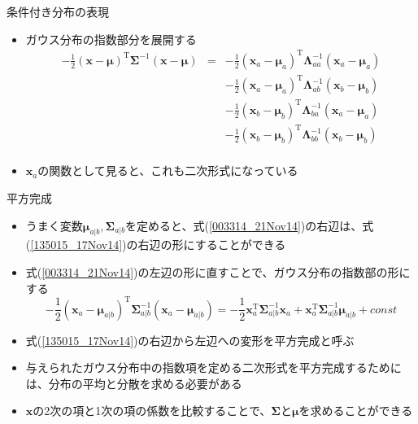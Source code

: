 \begin{frame}{条件付き分布の表現}
 \begin{itemize}
  \item ガウス分布の指数部分を展開する
        \begin{eqnarray}
         -\frac{1}{2}(\bm{x} - \bm{\mu})^{\mathrm{T}}\bm{\Sigma}^{-1}(\bm{x}-\bm{\mu}) &= &
          -\frac{1}{2}(\bm{x}_a - \bm{\mu}_a)^{\mathrm{T}}\bm{\Lambda}_{aa}^{-1}(\bm{x}_a-\bm{\mu}_a) \nonumber \\
         &&-\frac{1}{2}(\bm{x}_a - \bm{\mu}_a)^{\mathrm{T}}\bm{\Lambda}_{ab}^{-1}(\bm{x}_b-\bm{\mu}_b) \nonumber \\
         &&-\frac{1}{2}(\bm{x}_b - \bm{\mu}_b)^{\mathrm{T}}\bm{\Lambda}_{ba}^{-1}(\bm{x}_a-\bm{\mu}_a) \nonumber \\
         &&-\frac{1}{2}(\bm{x}_b - \bm{\mu}_b)^{\mathrm{T}}\bm{\Lambda}_{bb}^{-1}(\bm{x}_b-\bm{\mu}_b) \nonumber \\
         &&\label{003314_21Nov14}
        \end{eqnarray}
  \item $\bm{x}_a$の関数として見ると、これも\alert{二次形式}になっている
 \end{itemize}
\end{frame}

\begin{frame}{平方完成}
 \begin{itemize}
  \item うまく変数$\bm{\mu}_{a|b},\bm{\Sigma}_{a|b}$を定めると、式(\ref{003314_21Nov14})の右辺は、式(\ref{135015_17Nov14})の右辺の形にすることができる
  \item 式(\ref{003314_21Nov14})の左辺の形に直すことで、ガウス分布の指数部の形にする
        \begin{equation}
         -\frac{1}{2}(\bm{x}_a-\bm{\mu}_{a|b})^{\mathrm{T}}\bm{\Sigma}_{a|b}^{-1}(\bm{x}_a-\bm{\mu}_{a|b}) = -\frac{1}{2}\bm{x}_a^{\mathrm{T}}\bm{\Sigma}_{a|b}^{-1}\bm{x}_a+\bm{x}_a^{\mathrm{T}}\bm{\Sigma}_{a|b}^{-1}\bm{\mu}_{a|b} + const\label{135015_17Nov14}
        \end{equation}
  \item 式(\ref{135015_17Nov14})の右辺から左辺への変形を\alert{平方完成}と呼ぶ

  \item 与えられたガウス分布中の指数項を定める二次形式を平方完成するためには、分布の平均と分散を求める必要がある
  \item $\bm{x}$の2次の項と1次の項の係数を比較することで、$\bm{\Sigma}$と$\bm{\mu}$を求めることができる
 \end{itemize}
\end{frame}

